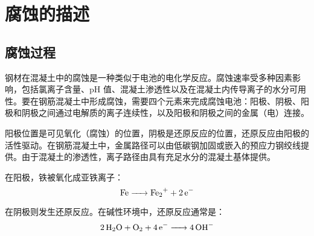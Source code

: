 \section{腐蚀的描述}
\label{sec:description-corrosion}
\subsection{腐蚀过程}
钢材在混凝土中的腐蚀是一种类似于电池的电化学反应。腐蚀速率受多种因素影响，包括氯离子含量、pH 值、混凝土渗透性以及在混凝土内传导离子的水分可用性。要在钢筋混凝土中形成腐蚀，需要四个元素来完成腐蚀电池：阳极、阴极、阳极和阴极之间通过电解质的离子连续性，以及阳极和阴极之间的金属（电）连接。

阳极位置是可见氧化（腐蚀）的位置，阴极是还原反应的位置，还原反应由阳极的活性驱动。在钢筋混凝土中，金属路径可以由低碳钢加固或嵌入的预应力钢绞线提供。由于混凝土的渗透性，离子路径由具有充足水分的混凝土基体提供。

在阳极，铁被氧化成亚铁离子：
\[ \ce{Fe -> Fe2+ + 2e-}\]

在阴极则发生还原反应。在碱性环境中，还原反应通常是：
\[ \ce{ 2H2O + O2 + 4e- -> 4OH- } \]

